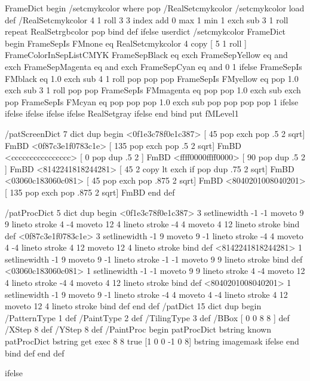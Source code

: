 FrameDict begin
/setcmykcolor where {
	pop /RealSetcmykcolor /setcmykcolor load def
} {
	/RealSetcmykcolor {
		4 1 roll
		3 { 3 index add 0 max 1 min 1 exch sub 3 1 roll} repeat 
		RealSetrgbcolor pop
	} bind def
} ifelse
userdict /setcmykcolor { 
		FrameDict begin
		FrameSepIs FMnone eq
		{ RealSetcmykcolor } 
		{
			4 copy [ 5 1 roll ]
			FrameColorInSepListCMYK
			{
				FrameSepBlack eq exch 
				FrameSepYellow eq and exch 
				FrameSepMagenta eq and exch 
				FrameSepCyan eq and 
				{ 0 } { 1 } ifelse
			}
			{
				FrameSepIs FMblack eq
				{1.0 exch sub 4 1 roll pop pop pop} {
				FrameSepIs FMyellow eq
				{pop 1.0 exch sub 3 1 roll pop pop} {
				FrameSepIs FMmagenta eq
				{pop pop 1.0 exch sub exch pop } {
				FrameSepIs FMcyan eq
				{pop pop pop 1.0 exch sub } 
				{pop pop pop pop 1} ifelse } ifelse } ifelse } ifelse 
			} ifelse
			RealSetgray
		}
		ifelse
		end
	} bind put
fMLevel1 { 
	
	
	
	/patScreenDict 7 dict dup begin
		<0f1e3c78f0e1c387> [ 45  { pop } {exch pop} 		.5   2 sqrt] FmBD
		<0f87c3e1f0783c1e> [ 135 { pop } {exch pop}			.5   2 sqrt] FmBD
		<cccccccccccccccc> [ 0   { pop } dup				.5   2	   ] FmBD
		<ffff0000ffff0000> [ 90  { pop } dup				.5   2	   ] FmBD
		<8142241818244281> [ 45  { 2 copy lt {exch} if pop}	dup .75  2 sqrt] FmBD
		<03060c183060c081> [ 45  { pop } {exch pop}			.875 2 sqrt] FmBD
		<8040201008040201> [ 135 { pop } {exch pop}			.875 2 sqrt] FmBD
	end def
} { 
	
	/patProcDict 5 dict dup begin
		<0f1e3c78f0e1c387> { 3 setlinewidth -1 -1 moveto 9 9 lineto stroke 
											4 -4 moveto 12 4 lineto stroke
											-4 4 moveto 4 12 lineto stroke} bind def
		<0f87c3e1f0783c1e> { 3 setlinewidth -1 9 moveto 9 -1 lineto stroke 
											-4 4 moveto 4 -4 lineto stroke
											4 12 moveto 12 4 lineto stroke} bind def
		<8142241818244281> { 1 setlinewidth -1 9 moveto 9 -1 lineto stroke
											-1 -1 moveto 9 9 lineto stroke } bind def
		<03060c183060c081> { 1 setlinewidth -1 -1 moveto 9 9 lineto stroke 
											4 -4 moveto 12 4 lineto stroke
											-4 4 moveto 4 12 lineto stroke} bind def
		<8040201008040201> { 1 setlinewidth -1 9 moveto 9 -1 lineto stroke 
											-4 4 moveto 4 -4 lineto stroke
											4 12 moveto 12 4 lineto stroke} bind def
	end def
	/patDict 15 dict dup begin
		/PatternType 1 def		
		/PaintType 2 def		
		/TilingType 3 def		
		/BBox [ 0 0 8 8 ] def 	
		/XStep 8 def			
		/YStep 8 def			
		/PaintProc {
			begin
			patProcDict bstring known {
				patProcDict bstring get exec
			} {
				8 8 true [1 0 0 -1 0 8] bstring imagemask
			} ifelse
			end
		} bind def
	end def
} ifelse
